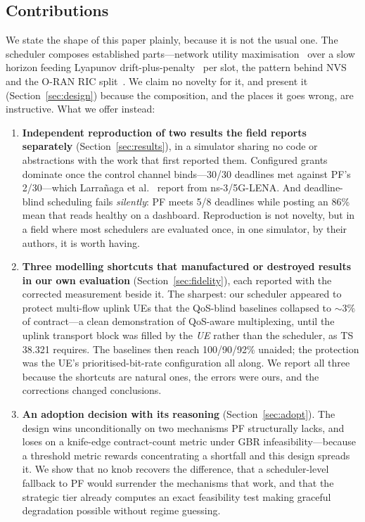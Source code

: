 \documentclass[conference]{IEEEtran}
\begin{document}
\subsection*{Contributions}

We state the shape of this paper plainly, because it is not the usual one.
The scheduler composes established parts---network utility
maximisation~\cite{kelly1998} over a slow horizon feeding Lyapunov
drift-plus-penalty~\cite{neely2010} per slot, the pattern behind
NVS~\cite{kokku2012} and the O-RAN RIC split~\cite{oran}. We claim no
novelty for it, and present it (Section~\ref{sec:design}) because the
composition, and the places it goes wrong, are instructive. What we offer
instead:

\begin{enumerate}
\item \textbf{Independent reproduction of two results the field reports
separately} (Section~\ref{sec:results}), in a simulator sharing no code or
abstractions with the work that first reported them. Configured grants
dominate once the control channel binds---30/30 deadlines met against PF's
2/30---which Larra\~{n}aga et al.~\cite{larranaga2023cg} report from
ns-3/5G-LENA. And deadline-blind scheduling fails \emph{silently}: PF meets
5/8 deadlines while posting an 86\% mean that reads healthy on a dashboard.
Reproduction is not novelty, but in a field where most schedulers are
evaluated once, in one simulator, by their authors, it is worth having.

\item \textbf{Three modelling shortcuts that manufactured or destroyed
results in our own evaluation} (Section~\ref{sec:fidelity}), each reported
with the corrected measurement beside it. The sharpest: our scheduler
appeared to protect multi-flow uplink UEs that the QoS-blind baselines
collapsed to ${\sim}3\%$ of contract---a clean demonstration of QoS-aware
multiplexing, until the uplink transport block was filled by the \emph{UE}
rather than the scheduler, as TS 38.321 requires. The baselines then reach
100/90/92\% unaided; the protection was the UE's prioritised-bit-rate
configuration all along. We report all three because the shortcuts are
natural ones, the errors were ours, and the corrections changed conclusions.

\item \textbf{An adoption decision with its reasoning}
(Section~\ref{sec:adopt}). The design wins unconditionally on two mechanisms
PF structurally lacks, and loses on a knife-edge contract-count metric under
GBR infeasibility---because a threshold metric rewards concentrating a
shortfall and this design spreads it. We show that no knob recovers the
difference, that a scheduler-level fallback to PF would surrender the
mechanisms that work, and that the strategic tier already computes an exact
feasibility test making graceful degradation possible without regime
guessing.
\end{enumerate}
\end{document}
